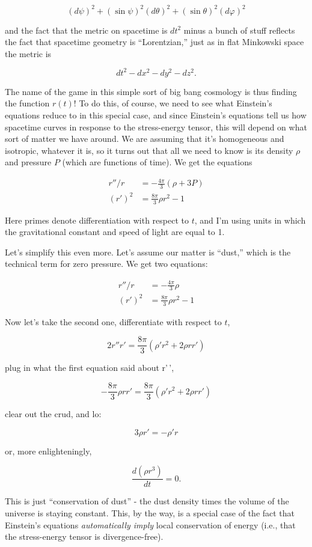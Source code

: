 \documentclass{article}
\begin{document}
\[(d\psi)^2 + (\sin \psi)^2{(d\theta)^2 + (\sin \theta)^2 (d\varphi)^2}\]

and the fact that the metric on spacetime is \(dt^2\) minus a bunch of
stuff reflects the fact that spacetime geometry is ``Lorentzian,'' just
as in flat Minkowski space the metric is

\[dt^2 - dx^2 - dy^2 - dz^2.\]

The name of the game in this simple sort of big bang cosmology is thus
finding the function \(r(t)\)! To do this, of course, we need to see
what Einstein's equations reduce to in this special case, and since
Einstein's equations tell us how spacetime curves in response to the
stress-energy tensor, this will depend on what sort of matter we have
around. We are assuming that it's homogeneous and isotropic, whatever it
is, so it turns out that all we need to know is its density \(\rho\) and
pressure \(P\) (which are functions of time). We get the equations

\[\begin{aligned}r''/r &= -\frac{4\pi}{3}(\rho+3P) \\ (r')^2 &= \frac{8\pi}{3}\rho r^2 - 1\end{aligned}\]

Here primes denote differentiation with respect to \(t\), and I'm using
units in which the gravitational constant and speed of light are equal
to 1.

Let's simplify this even more. Let's assume our matter is ``dust,''
which is the technical term for zero pressure. We get two equations:

\[\begin{aligned}r''/r &= -\frac{4\pi}{3}\rho \\ (r')^2 &= \frac{8\pi}{3}\rho r^2 - 1\end{aligned}\tag{1}\]

Now let's take the second one, differentiate with respect to \(t\),

\[2r''r' = \frac{8\pi}{3}(\rho'r^2 + 2 \rho r r')\]

plug in what the first equation said about r'\,',

\[-\frac{8\pi}{3} \rho r r' = \frac{8\pi}{3}(\rho' r^2 + 2 \rho r r')\]

clear out the crud, and lo:

\[3 \rho r' = - \rho' r\]

or, more enlighteningly,

\[\frac{d(\rho r^3)}{dt} = 0.\]

This is just ``conservation of dust'' - the dust density times the
volume of the universe is staying constant. This, by the way, is a
special case of the fact that Einstein's equations \emph{automatically
imply} local conservation of energy (i.e., that the stress-energy tensor
is divergence-free).
\end{document}
